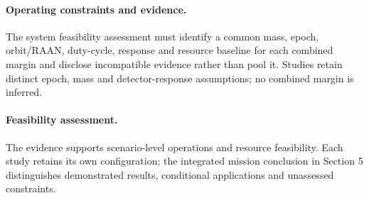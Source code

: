 \paragraph{Operating constraints and evidence.} 
The system feasibility assessment must identify a common mass, epoch, orbit/RAAN, duty-cycle, response and resource baseline for each combined margin and disclose incompatible evidence rather than pool it. Studies retain distinct epoch, mass and detector-response assumptions; no combined margin is inferred.

\paragraph{Feasibility assessment.} The evidence supports scenario-level operations and resource feasibility. Each study retains its own configuration; the integrated mission conclusion in Section 5 distinguishes demonstrated results, conditional applications and unassessed constraints.
